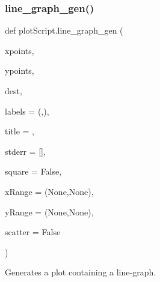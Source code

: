 \subsubsection{\texorpdfstring{line\_graph\_gen()}{line\_graph\_gen()}}
{\footnotesize\ttfamily def plot\+Script.\+line\+\_\+graph\+\_\+gen (\begin{DoxyParamCaption}\item[{}]{xpoints,  }\item[{}]{ypoints,  }\item[{}]{dest,  }\item[{}]{labels = {\ttfamily (\textquotesingle{}\textquotesingle{},\textquotesingle{}\textquotesingle{})},  }\item[{}]{title = {\ttfamily \textquotesingle{}\textquotesingle{}},  }\item[{}]{stderr = {\ttfamily \mbox{[}\mbox{]}},  }\item[{}]{square = {\ttfamily False},  }\item[{}]{x\+Range = {\ttfamily (None,None)},  }\item[{}]{y\+Range = {\ttfamily (None,None)},  }\item[{}]{scatter = {\ttfamily False} }\end{DoxyParamCaption})}



Generates a plot containing a line-\/graph. 


